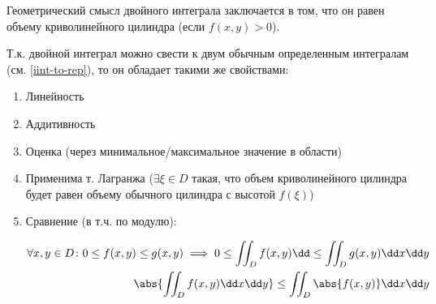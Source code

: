 \begin{remark}
  Геометрический смысл двойного интеграла заключается в том, что он равен
  объему криволинейного цилиндра (если \(f(x, y) > 0\)).
\end{remark}

Т.к. двойной интеграл можно свести к двум обычным определенным интегралам
(см. \ref{iint-to-rep}), то он обладает такими же свойствами:
\begin{enumerate}
  \item Линейность
  \item Аддитивность
  \item Оценка (через минимальное/максимальное значение в области)
  \item Применима т. Лагранжа (\(\exists \xi \in D\) такая, что объем
  криволинейного цилиндра будет равен объему обычного цилиндра с высотой
  \(f(\xi)\))
  \item Сравнение (в т.ч. по модулю):
  
  \begin{align*}
    \forall x, y \in D \colon
    0 \le f(x, y) \le g(x, y)
    \implies 0 \le \iint_{D} f(x, y) \dd  \le \iint_{D} g(x, y) \dd x \dd y
    \\
    \abs{\iint_{D} f(x, y) \dd x \dd y} \le \iint_{D} \abs{f(x, y)} \dd x \dd y
  \end{align*}
\end{enumerate}